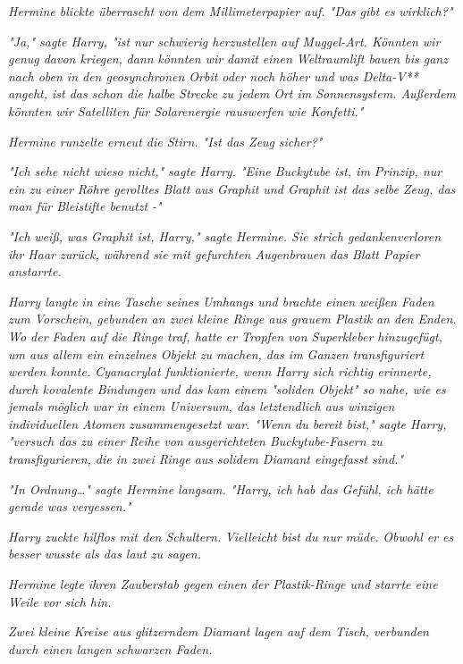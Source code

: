 {\emph{Hermine blickte überrascht von dem Millimeterpapier auf. "Das gibt es} \emph{\emph{wirklich?}"}

\emph{"Ja," sagte Harry, "ist} \emph{nur schwierig herzustellen auf Muggel-Art. Könnten wir genug davon kriegen,} \emph{dann} \emph{könnten wir damit einen Weltraumlift bauen bis ganz nach oben in den geosynchronen Orbit oder noch höher und was Delta-V** angeht, ist das schon die halbe Strecke zu jedem Ort im Sonnensystem. Außerdem könnten wir Satelliten für Solarenergie rauswerfen wie Konfetti."}

\emph{Hermine runzelte erneut die Stirn. "Ist das Zeug} \emph{\emph{sicher?}"}

\emph{"Ich sehe nicht wieso nicht," sagte Harry. "Eine Buckytube ist, im Prinzip, nur ein zu einer Röhre gerolltes Blatt aus Graphit und Graphit ist das selbe Zeug, das man für Bleistifte benutzt -"}

\emph{"Ich} \emph{\emph{weiß,}} \emph{was Graphit ist, Harry," sagte Hermine. Sie strich gedankenverloren ihr Haar zurück, während sie mit gefurchten Augenbrauen das Blatt Papier anstarrte.}

\emph{Harry langte in eine Tasche seines Umhangs und brachte einen weißen Faden zum Vorschein, gebunden an zwei kleine Ringe aus grauem Plastik} \emph{an den Enden. Wo der Faden auf die Ringe traf, hatte er Tropfen von Superkleber hinzugefügt, um aus allem ein einzelnes Objekt zu machen, das im Ganzen transfiguriert werden konnte. Cyanacrylat funktionierte, wenn Harry sich richtig erinnerte, durch kovalente Bindungen und das kam einem "soliden Objekt" so nahe, wie es jemals möglich war in einem Universum, das letztendlich aus winzigen individuellen Atomen zusammengesetzt war. "Wenn du bereit bist," sagte Harry, "versuch das zu einer Reihe von ausgerichteten Buckytube-Fasern zu transfigurieren, die in zwei Ringe aus solidem Diamant eingefasst sind."}

\emph{"In Ordnung…" sagte Hermine langsam. "Harry, ich hab das Gefühl, ich hätte gerade was vergessen."}

\emph{Harry zuckte hilflos mit den Schultern.} \emph{\emph{Vielleicht bist du nur müde.}} \emph{Obwohl er es besser wusste als das laut zu sagen.}

\emph{Hermine legte ihren Zauberstab gegen einen der Plastik-Ringe und starrte eine Weile vor sich hin.}

\emph{Zwei kleine Kreise aus glitzerndem Diamant lagen auf dem Tisch, verbunden durch einen langen schwarzen Faden.}

}

